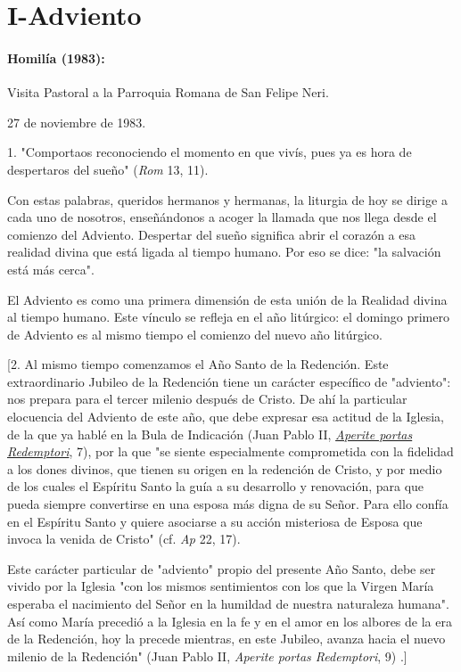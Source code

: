\chapter{I-Adviento}

\subsubsection{Homilía (1983): }

Visita Pastoral a la Parroquia Romana de San Felipe Neri.

27 de noviembre de 1983.

1. "Comportaos reconociendo el momento en que vivís, pues ya es hora de
despertaros del sueño" (\emph{Rom} 13, 11).

Con estas palabras, queridos hermanos y hermanas, la liturgia de hoy se
dirige a cada uno de nosotros, enseñándonos a acoger la llamada que nos
llega desde el comienzo del Adviento. Despertar del sueño significa
abrir el corazón a esa realidad divina que está ligada al tiempo humano.
Por eso se dice: "la salvación está más cerca".

El Adviento es como una primera dimensión de esta unión de la Realidad
divina al tiempo humano. Este vínculo se refleja en el año litúrgico: el
domingo primero de Adviento es al mismo tiempo el comienzo del nuevo año
litúrgico.

{[}2. Al mismo tiempo comenzamos el Año Santo de la Redención. Este
extraordinario Jubileo de la Redención tiene un carácter específico de
"adviento": nos prepara para el tercer milenio después de Cristo. De ahí
la particular elocuencia del Adviento de este año, que debe expresar esa
actitud de la Iglesia, de la que ya hablé en la Bula de Indicación (Juan
Pablo II,
\href{http://www.vatican.va/content/john-paul-ii/it/jubilee/documents/hf_jp-ii_doc_19830106_bolla-redenzione.html}{\emph{\emph{Aperite
			portas Redemptori}}}, 7), por la que "se siente especialmente
comprometida con la fidelidad a los dones divinos, que tienen su origen
en la redención de Cristo, y por medio de los cuales el Espíritu Santo
la guía a su desarrollo y renovación, para que pueda siempre convertirse
en una esposa más digna de su Señor. Para ello confía en el Espíritu
Santo y quiere asociarse a su acción misteriosa de Esposa que invoca la
venida de Cristo" (cf. \emph{Ap} 22, 17).

Este carácter particular de "adviento" propio del presente Año Santo,
debe ser vivido por la Iglesia "con los mismos sentimientos con los que
la Virgen María esperaba el nacimiento del Señor en la humildad de
nuestra naturaleza humana". Así como María precedió a la Iglesia en la
fe y en el amor en los albores de la era de la Redención, hoy la precede
mientras, en este Jubileo, avanza hacia el nuevo milenio de la
Redención" (Juan Pablo II, \emph{Aperite portas Redemptori}, 9) .{]}

